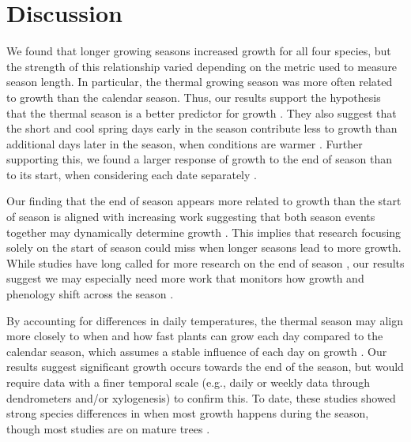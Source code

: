 \documentclass{article}\usepackage[]{graphicx}\usepackage[]{xcolor}
\begin{document}
\section{Discussion} 
We found that longer growing seasons increased growth for all four species, but the strength of this relationship varied depending on the metric used to measure season length. In particular, the thermal growing season was more often related to growth than the calendar season. Thus, our results support the hypothesis that the thermal season is a better predictor for growth \citep{chuine_processbased_2017,wang_simulation_1998}. They also suggest that the short and cool spring days early in the season contribute less to growth than additional days later in the season, when conditions are warmer \citep{buonaiuto_early_2026}. Further supporting this, we found a larger response of growth to the end of season than to its start, when considering each date separately \citep{zhang_drought_2021}.

Our finding that the end of season appears more related to growth than the start of season is aligned with increasing work suggesting that both season events together may dynamically determine growth \citep{zohner_effect_2023}. This implies that research focusing solely on the start of season \citep{dow_warm_2022,gaoEarlierStartThermal2022,wheeler_snow_2016} could miss when longer seasons lead to more growth. While studies have long called for more research on the end of season \citep{gallinat_autumn_2015,gunderson_forest_2012,piao_plant_2019,richardson_terrestrial_2012}, our results suggest we may especially need more work that monitors how growth and phenology shift across the season \citep{zani_increased_2020,zohner_effect_2023}. 

By accounting for differences in daily temperatures, the thermal season may align more closely to when and how fast plants can grow each day compared to the calendar season, which assumes a stable influence of each day on growth \citep{korner_four_2023}. Our results suggest significant growth occurs towards the end of the season, but would require data with a finer temporal scale (e.g., daily or weekly data through dendrometers and/or xylogenesis) to confirm this. To date, these studies showed strong species differences in when most growth happens during the season, though most studies are on mature trees \citep[e.g.][]{zweifel_are_2016,etzold_number_2022,balducci_stem_2019}. 
\end{document}
